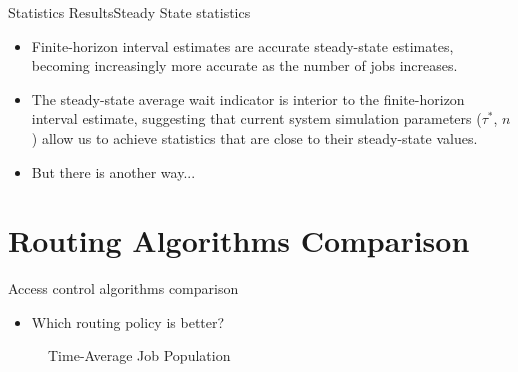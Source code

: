 \documentclass[10pt]{beamer}
\begin{document}
\begin{frame}{Statistics Results}{Steady State statistics}

\begin{itemize}
\item Finite-horizon interval estimates are accurate steady-state estimates, becoming increasingly more accurate as the number of jobs increases.

\item The steady-state average wait indicator is interior to the finite-horizon interval estimate, suggesting that current system simulation parameters ($\tau^*$, $n$) allow us to achieve statistics that are close to their steady-state values.

\item But there is another way...

\end{itemize}
\end{frame}


\section{Routing Algorithms Comparison}
\begin{frame}[fragile]{Access control algorithms comparison}{}

\begin{itemize}
\item Which routing policy is better?
\end{itemize}

\begin{figure}
    \centering
    \caption{Time-Average Job Population}%
\end{figure}



\end{frame}
\end{document}
